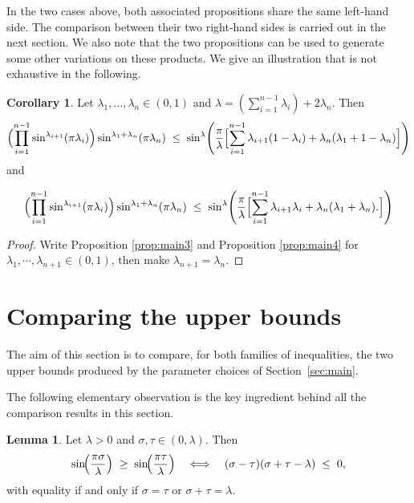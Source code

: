 \documentclass[12pt]{amsart}
\theoremstyle{definition}
\newtheorem{lemma}{Lemma}[section]
\newtheorem{corollary}{Corollary}[section]
\begin{document}
In the two cases above, both associated propositions share the same left-hand side. The comparison between their two right-hand sides is carried out in the next section. We also note that the two propositions can be used to generate some other variations on these products. We give an illustration that is not exhaustive in the following.
\begin{corollary}\label{cor:main34}
 Let $\lambda_1,\ldots,\lambda_n\in(0,1)$ and
$\lambda=\left(\displaystyle\sum_{i=1}^{n-1}\lambda_i\right)+2\lambda_n$.  Then
\begin{equation}\label{eq:propmain31}
  \Bigl(\prod_{i=1}^{n-1}\sin^{\lambda_{i+1}}(\pi\lambda_i)\Bigr)
  \sin^{\lambda_1+\lambda_n}(\pi\lambda_n)
  \;\leq\;
  \sin^\lambda\!\left(\frac\pi\lambda
  \Bigl[\sum_{i=1}^{n-1}\lambda_{i+1}(1-\lambda_i)+\lambda_n(\lambda_1+1-\lambda_n)
  \Bigr]\right)
\end{equation}
 and  

 \begin{equation}\label{eq:propmain41}
  \Bigl(\prod_{i=1}^{n-1}\sin^{\lambda_{i+1}}(\pi\lambda_i)\Bigr)
  \sin^{\lambda_1+\lambda_n}(\pi\lambda_n)
  \;\leq\;
  \sin^\lambda\!\left(\frac\pi\lambda
  \Bigl[\sum_{i=1}^{n-1}\lambda_{i+1}\lambda_i+\lambda_n(\lambda_1+\lambda_n).
  \Bigr]\right)
\end{equation}

\end{corollary}
\begin{proof}
Write Proposition \ref{prop:main3} and Proposition \ref{prop:main4} for $\lambda_1,\cdots,\lambda_{n+1}\in (0,1)$, then make $\lambda_{n+1}=\lambda_n$.    
\end{proof}

\section{Comparing the upper bounds}\label{sec:compare}

The aim of this section is to compare, for both families of inequalities,
the two upper bounds produced by the parameter choices of
Section~\ref{sec:main}.  

The following elementary observation is the key ingredient behind all the comparison results in this section.

\begin{lemma}\label{lem:sincompare}
Let $\lambda>0$ and $\sigma,\tau\in(0,\lambda)$.  Then
\[
  \sin\!\Bigl(\frac{\pi\sigma}{\lambda}\Bigr)
  \;\geq\;
  \sin\!\Bigl(\frac{\pi\tau}{\lambda}\Bigr)
  \quad\Longleftrightarrow\quad
  (\sigma-\tau)(\sigma+\tau-\lambda)\;\leq\;0,
\]
with equality if and only if $\sigma=\tau$ or $\sigma+\tau=\lambda$.
\end{lemma}
\end{document}
